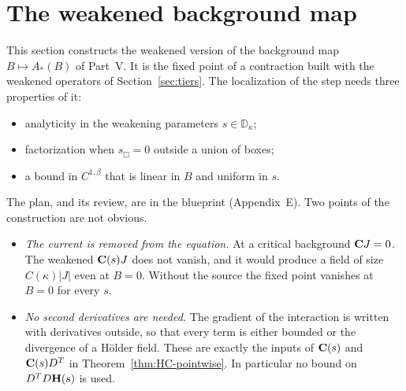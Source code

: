 \section{The weakened background map}\label{sec:weak-background}

This section constructs the weakened version of the background map $B\mapsto A_*(B)$ of Part~V. It is the fixed point of a contraction built with the weakened operators of Section~\ref{sec:tiers}. The localization of the step needs three properties of it:
\begin{itemize}
\item analyticity in the weakening parameters $s\in\mathbb D_\kappa$;
\item factorization when $s_\Box=0$ outside a union of boxes;
\item a bound in $C^{1,\beta}$ that is linear in $B$ and uniform in $s$.
\end{itemize}
The plan, and its review, are in the blueprint (Appendix~E). Two points of the construction are not obvious.
\begin{itemize}
\item \emph{The current is removed from the equation.} At a critical background $\mathbf C J=0$. The weakened $\mathbf C(s)J$ does not vanish, and it would produce a field of size $C(\kappa)|J|$ even at $B=0$. Without the source the fixed point vanishes at $B=0$ for every $s$.
\item \emph{No second derivatives are needed.} The gradient of the interaction is written with derivatives outside, so that every term is either bounded or the divergence of a H\"older field. These are exactly the inputs of $\mathbf C(s)$ and $\mathbf C(s)D^T$ in Theorem~\ref{thm:HC-pointwise}. In particular no bound on $D^TD\mathbf H(s)$ is used.
\end{itemize}

